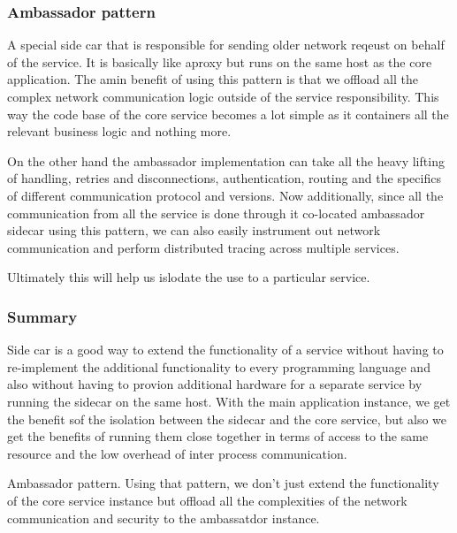 \documentclass[a4paper, 11pt]{book}
\begin{document}
    \subsubsection{Ambassador pattern}
    A special side car that is responsible for sending older network reqeust on behalf of the service.
    It is basically like aproxy but runs on the same host as the core application.
    The amin benefit of using this pattern is that we offload all the complex network communication logic outside of the service responsibility.
    This way the code base of the core service becomes a lot simple as it containers all the relevant business logic and nothing more.

    On the other hand the ambassador implementation can take all the heavy lifting of handling, retries and disconnections, authentication, routing and the specifics of different communication protocol and versions.
    Now additionally, since all the communication from all the service is done through it co-located ambassador sidecar using this pattern, we can also easily instrument out network communication and perform distributed tracing across multiple services.

    Ultimately this will help us islodate the use to a particular service.

    \subsubsection{Summary}
    Side car is a good way to extend the functionality of a service without having to re-implement the additional functionality to every programming language and also without having to provion additional hardware for a separate service by running the sidecar on the same host.
    With the main application instance, we get the benefit sof the isolation between the sidecar and the core service, but also we get the benefits of running them close together in terms of access to the same resource and the low overhead of inter process communication.

    Ambassador pattern.
    Using that pattern, we don't just extend the functionality of the core service instance but offload all the complexities of the network communication and security to the ambassatdor instance.
\end{document}
